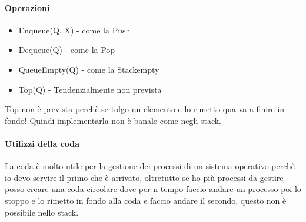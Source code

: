\paragraph*{Operazioni}
\begin{itemize}
    \item Enqueue(Q, X) - come la Push
    \item Dequeue(Q) - come la Pop
    \item QueueEmpty(Q) - come la Stackempty
    \item Top(Q) - Tendenzialmente non prevista
\end{itemize}
Top non è prevista perchè se tolgo un elemento e lo rimetto qua va a finire in fondo!
Quindi implementarla non è banale come negli stack.\\
\paragraph*{Utilizzi della coda} La coda è molto utile per la gestione dei processi
di un sistema operativo perchè io devo servire il primo che è arrivato, oltretutto
se ho più processi da gestire posso creare una coda circolare dove per n tempo faccio
andare un processo poi lo stoppo e lo rimetto in fondo alla coda e faccio andare il secondo,
questo non è possibile nello stack.